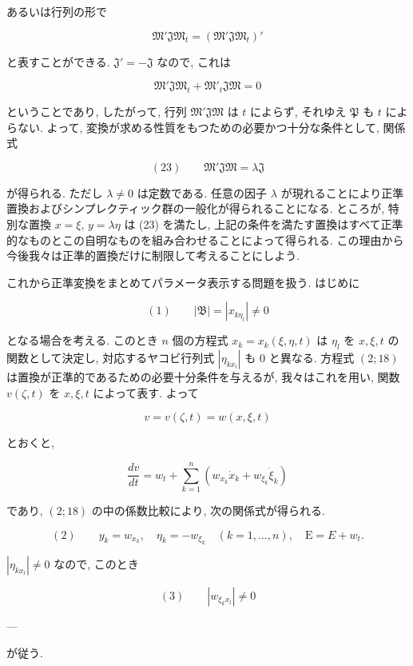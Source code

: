 \documentclass[dvipdfmx, leqno]{jsbook}
\begin{document}
あるいは行列の形で

$$\mathfrak{M}' \mathfrak{J} \mathfrak{M}_t = (\mathfrak{M}' \mathfrak{J} \mathfrak{M}_t)'$$

と表すことができる. $\mathfrak{J}' = -\mathfrak{J}$ なので, これは

$$\mathfrak{M}'\mathfrak{J}\mathfrak{M}_t + \mathfrak{M}'_t\mathfrak{J}\mathfrak{M} = 0$$

ということであり, したがって, 行列 $\mathfrak{M}'\mathfrak{J}\mathfrak{M}$ は $t$ によらず, それゆえ $\mathfrak{P}$ も $t$ によらない. よって, 変換が求める性質をもつための必要かつ十分な条件として, 関係式

$$(23) \qquad \mathfrak{M}'\mathfrak{J}\mathfrak{M} = \lambda\mathfrak{J}$$

が得られる. ただし $\lambda \neq 0$ は定数である. 任意の因子 $\lambda$ が現れることにより正準置換およびシンプレクティック群の一般化が得られることになる. ところが, 特別な置換 $x = \xi, \, y = \lambda\eta$ は (23) を満たし, 上記の条件を満たす置換はすべて正準的なものとこの自明なものを組み合わせることによって得られる. この理由から今後我々は正準的置換だけに制限して考えることにしよう.


これから正準変換をまとめてパラメータ表示する問題を扱う. はじめに

$$(1) \qquad |\mathfrak{B}| = |x_{k\eta_l}| \neq 0$$

となる場合を考える. このとき $n$ 個の方程式 $x_k = x_k(\xi, \eta, t)$ は $\eta_l$ を $x, \xi, t$ の関数として決定し, 対応するヤコビ行列式 $|\eta_{kx_l}|$ も $0$ と異なる. 方程式 $(2;18)$ は置換が正準的であるための必要十分条件を与えるが, 我々はこれを用い, 関数 $v(\zeta, t)$ を $x, \xi, t$ によって表す. よって

$$v = v(\zeta, t) = w(x, \xi, t)$$

とおくと,

$$\frac{dv}{dt} = w_t + \sum_{k=1}^{n} (w_{x_k} \dot{x}_k + w_{\xi_k} \dot{\xi}_k)$$

であり, $(2;18)$ の中の係数比較により, 次の関係式が得られる.

$$(2) \qquad y_k = w_{x_k}, \quad \eta_k = -w_{\xi_k} \quad (k=1,\dots,n), \quad \mathrm{E} = E + w_t.$$

$|\eta_{kx_l}| \neq 0$ なので, このとき

$$(3) \qquad |w_{\xi_k x_l}| \neq 0$$

---

が従う.
\end{document}
